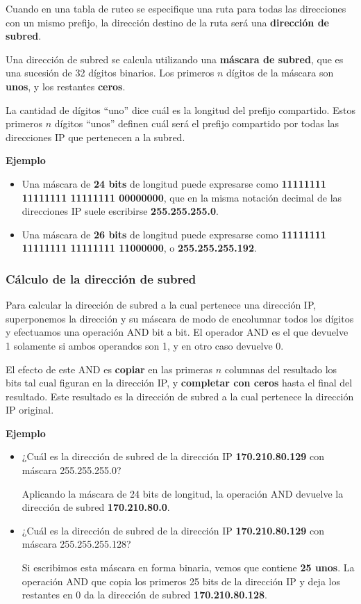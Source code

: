 \documentclass[spanish,A4,]{article}
\begin{document}
Cuando en una tabla de ruteo se especifique una ruta para todas las
direcciones con un mismo prefijo, la dirección destino de la ruta será
una \textbf{dirección de subred}.

Una dirección de subred se calcula utilizando una \textbf{máscara de
subred}, que es una sucesión de 32 dígitos binarios. Los primeros $n$
dígitos de la máscara son \textbf{unos}, y los restantes \textbf{ceros}.

La cantidad de dígitos ``uno'' dice cuál es la longitud del prefijo
compartido. Estos primeros $n$ dígitos ``unos'' definen cuál será el
prefijo compartido por todas las direcciones IP que pertenecen a la
subred.

\textbf{Ejemplo}

\begin{itemize}
\itemsep1pt\parskip0pt
\item
  Una máscara de \textbf{24 bits} de longitud puede expresarse como
  \textbf{11111111 11111111 11111111 00000000}, que en la misma notación
  decimal de las direcciones IP suele escribirse \textbf{255.255.255.0}.
\item
  Una máscara de \textbf{26 bits} de longitud puede expresarse como
  \textbf{11111111 11111111 11111111 11000000}, o
  \textbf{255.255.255.192}.
\end{itemize}

\subsubsection{Cálculo de la dirección de
subred}\label{cuxe1lculo-de-la-direcciuxf3n-de-subred}

Para calcular la dirección de subred a la cual pertenece una dirección
IP, superponemos la dirección y su máscara de modo de encolumnar todos
los dígitos y efectuamos una operación AND bit a bit. El operador AND es
el que devuelve 1 solamente si ambos operandos son 1, y en otro caso
devuelve 0.

El efecto de este AND es \textbf{copiar} en las primeras $n$ columnas
del resultado los bits tal cual figuran en la dirección IP, y
\textbf{completar con ceros} hasta el final del resultado. Este
resultado es la dirección de subred a la cual pertenece la dirección IP
original.

\textbf{Ejemplo}

\begin{itemize}
\item
  ¿Cuál es la dirección de subred de la dirección IP
  \textbf{170.210.80.129} con máscara 255.255.255.0?

  Aplicando la máscara de 24 bits de longitud, la operación AND devuelve
  la dirección de subred \textbf{170.210.80.0}.
\item
  ¿Cuál es la dirección de subred de la dirección IP
  \textbf{170.210.80.129} con máscara 255.255.255.128?

  Si escribimos esta máscara en forma binaria, vemos que contiene
  \textbf{25 unos}. La operación AND que copia los primeros 25 bits de
  la dirección IP y deja los restantes en 0 da la dirección de subred
  \textbf{170.210.80.128}.
\end{itemize}
\end{document}
